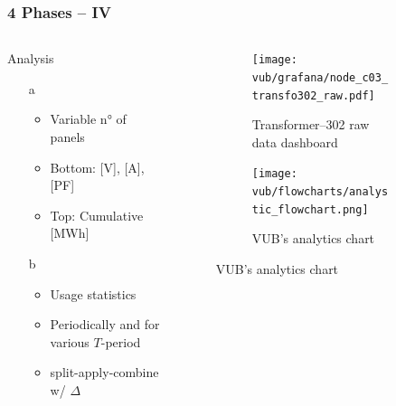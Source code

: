 \begin{frame}
    \frametitle{4 Phases -- IV}
    \vspace*{\fill}
    \begin{columns}[onlytextwidth, c]
        \begin{column}{.47\textwidth}
            \begin{exampleblock}{Analysis}
                \begin{itemize}
                    \item[a]
                        \begin{itemize} %
                            \item Variable n° of panels
                            \item Bottom: [V], [A], [PF]
                            \item Top: Cumulative [MWh]
                        \end{itemize}
                    \item[b]
                        \begin{itemize}
                            \item Usage statistics
                            \item Periodically and for various $T$-period
                            \item split-apply-combine w/ $\Delta$
                        \end{itemize}
                \end{itemize}
            \end{exampleblock}
        \end{column}
        \begin{column}{.52\textwidth}
            \begin{figure}[ht]
                \begin{subfigure}{\textwidth}
                    \centering
                    \texttt{[image: vub/grafana/node\_c03\_transfo302\_raw.pdf]}
                    \caption{Transformer--302 raw data dashboard}
                \end{subfigure}
                \begin{subfigure}{\textwidth}
                    \centering
                    \texttt{[image: vub/flowcharts/analystic\_flowchart.png]}
                    \caption{\acs{VUB}'s analytics chart}
                \end{subfigure}
            \end{figure}
        \end{column}
    \end{columns}
    \vspace*{\fill}
\end{frame}


